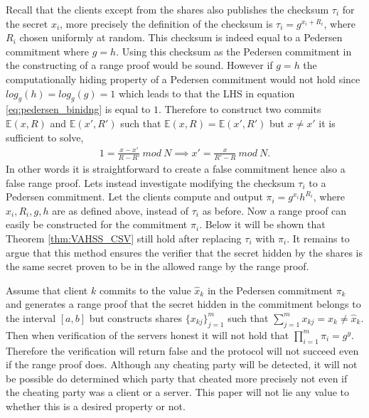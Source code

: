 Recall that the clients except from the shares also publishes the checksum $\tau_i$ for the secret $x_i$, more precisely the definition of the checksum is  $\tau_i=g^{x_i+R_i}$, where $R_i$ chosen uniformly at random. This checksum is indeed equal to a Pedersen commitment where $g=h$. Using this checksum as the Pedersen commitment in the constructing of a range proof would be sound. However if $g=h$ the computationally hiding property of a Pedersen commitment would not hold since $log_g(h)=log_g(g)=1$ which leads to that the LHS in equation \eqref{eq:pedersen_binidng} is equal to $1$. Therefore to construct two commits $\mathds{E}(x,R)$ and $\mathds{E}(x',R')$ such that $\mathds{E}(x,R) = \mathds{E}(x',R')$ but $x\neq x'$ it is sufficient to solve, 
\begin{align*}
1 = \frac{x-x'}{R-R'}\:mod \:N \implies x' = \frac{x}{R'-R} \:mod\: N.
\end{align*}
In other words it is straightforward to create a false commitment hence also a false range proof. Lets instead investigate modifying the checksum $\tau_i$ to a Pedersen commitment. Let the clients compute and output $\pi_i=g^{x_i}h^{R_i}$, where $x_i,R_i,g,h$ are as defined above, instead of $\tau_i$ as before.  Now a range proof can easily be constructed for the commitment $\pi_i$. Below it will be shown that Theorem \ref{thm:VAHSS_CSV} still hold after replacing $\tau_i$ with $\pi_i$. It remains to argue that this method ensures the verifier that the secret hidden by the shares is the same secret proven to be in the allowed range by the range proof. 

Assume that client $k$ commits to the value $\hat{x}_k$ in the Pedersen commitment $\pi_k$ and generates a range proof that the secret hidden in the commitment belongs to the interval $[a,b]$ but constructs shares $\{x_{kj}\}_{j=1}^m$ such that $\sum_{j=1}^m x_{kj} = x_k \neq \hat{x}_k$. Then when verification of the servers honest it will not hold that $\prod_{i=1}^m \pi_i = g^y$. Therefore the verification will return false and the protocol will not succeed even if the range proof does. Although any cheating party will be detected, it will not be possible do determined which party that cheated more precisely not even if the cheating party was a client or a server. This paper will not lie any value to whether this is a desired property or not. 

